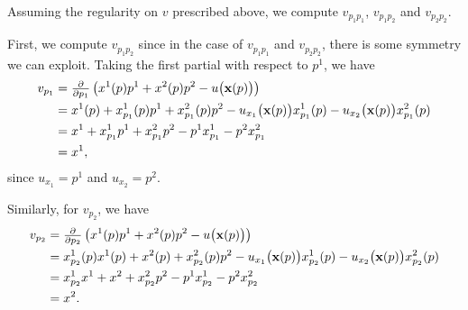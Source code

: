 \begin{solution}
  Assuming the regularity on \(v\) prescribed above, we compute
  \(v_{p_1p_1}\), \(v_{p_1p_2}\) and \(v_{p_2p_2}\).

  First, we compute \(v_{p_1p_2}\) since in the case of \(v_{p_1p_1}\) and
  \(v_{p_2p_2}\), there is some symmetry we can exploit. Taking the first
  partial with respect to \(p^1\), we have
  \begin{equation}
    \label{eq:3:vp1}
    \begin{aligned}
      v_{p_1} &=\tfrac{\partial}{\partial
        p_1}\left(x^1(p)p^1+x^2(p)p^2-u\bigl(\mathbf{x}(p)\bigr)\right)\\
      &=x^1(p)+x^1_{p_1}(p)p^1+x^2_{p_1}(p)p^2
      -u_{x_1}\bigl(\mathbf{x}(p)\bigr)x^1_{p_1}(p)-u_{x_2}\bigl(\mathbf{x}(p)\bigr)x^2_{p_1}(p)\\
      &=x^1+x^1_{p_1}p^1+x^2_{p_1}p^2-p^1x^1_{p_1}-p^2x^2_{p_1}\\
      &=x^1,
    \end{aligned}
  \end{equation}
  since \(u_{x_1}=p^1\) and \(u_{x_2}=p^2\).

  Similarly, for \(v_{p_2}\), we have
  \begin{equation}
    \label{eq:3:vp2}
    \begin{aligned}
      v_{p_2} &=\tfrac{\partial}{\partial
        p_2}\left(x^1(p)p^1+x^2(p)p^2-u\bigl(\mathbf{x}(p)\bigr)\right)\\
      &=x^1_{p_2}(p)x^1(p)+x^2(p)+x^2_{p_2}(p)p^2
      -u_{x_1}\bigl(\mathbf{x}(p)\bigr)x^1_{p_2}(p)
      -u_{x_2}\bigl(\mathbf{x}(p)\bigr)x^2_{p_2}(p)\\
      &=x^1_{p_2}x^1+x^2+x^2_{p_2}p^2
      -p^1x^1_{p_2}
      -p^2x^2_{p_2}\\
      &=x^2.
    \end{aligned}
  \end{equation}


\end{solution}
